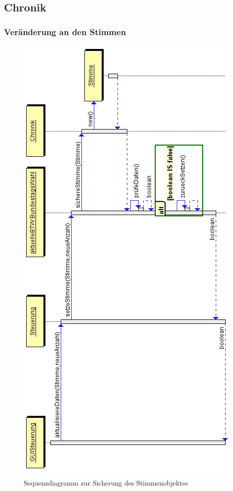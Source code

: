 \documentclass[12pt,a4paper,titlepage]{article}
\begin{document}
\newpage
\subsection{Chronik}
\subsubsection{Veränderung an den Stimmen}
	\begin{figure}[!ht]
	\centering
	\includegraphics[scale=0.65]{Sequenzdiagramme/Chronik_Sequenzdiagramm-stimmenaendern.png} \caption{Sequenzdiagramm zur Sicherung des Stimmenobjektes}
	\end{figure}
\end{document}
